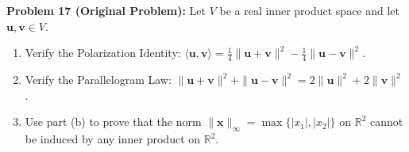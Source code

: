 \documentclass[11pt, letterpaper]{article}
\theoremstyle{definition}
\theoremstyle{remark}
\begin{document}
\medskip

\textbf{Problem 17 (Original Problem):} Let $V$ be a real inner product space and let $\mathbf{u}, \mathbf{v} \in V$.
\begin{enumerate}[label=(\alph*)]
    \item Verify the Polarization Identity: $\langle \mathbf{u}, \mathbf{v} \rangle = \frac{1}{4}\|\mathbf{u} + \mathbf{v}\|^2 - \frac{1}{4}\|\mathbf{u} - \mathbf{v}\|^2$.
    \item Verify the Parallelogram Law: $\|\mathbf{u} + \mathbf{v}\|^2 + \|\mathbf{u} - \mathbf{v}\|^2 = 2\|\mathbf{u}\|^2 + 2\|\mathbf{v}\|^2$.
    \item Use part (b) to prove that the norm $\|\mathbf{x}\|_\infty = \max\{|x_1|, |x_2|\}$ on $\mathbb{R}^2$ cannot be induced by any inner product on $\mathbb{R}^2$.
\end{enumerate}
\end{document}
